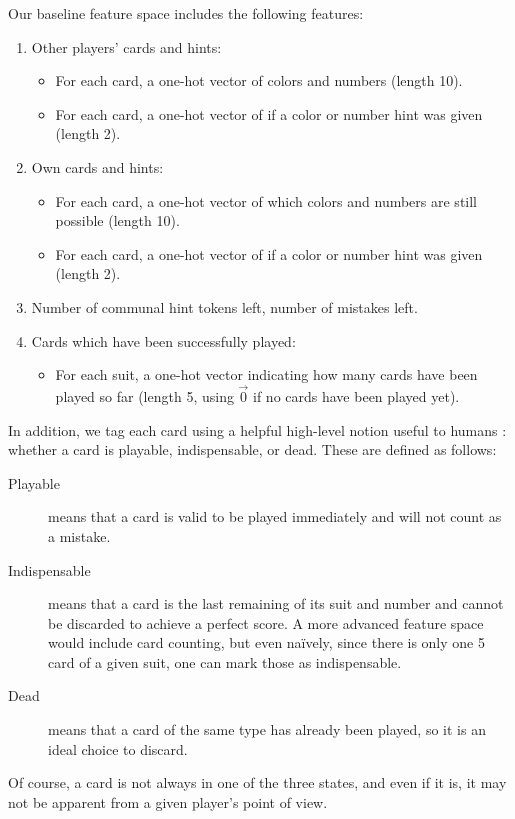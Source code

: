 \documentclass{article}
\begin{document}
Our baseline feature space includes the following features:
\begin{enumerate}
\item Other players' cards and hints:
  \begin{itemize}
  \item For each card, a one-hot vector of colors and numbers (length 10).
  \item For each card, a one-hot vector of if a color or number hint was given (length 2).
  \end{itemize}
\item Own cards and hints:
  \begin{itemize}
  \item For each card, a one-hot vector of which colors and numbers are still possible (length 10).
  \item For each card, a one-hot vector of if a color or number hint was given (length 2).
  \end{itemize}
\item Number of communal hint tokens left, number of mistakes left.
\item Cards which have been successfully played:
  \begin{itemize}
  \item For each suit, a one-hot vector indicating how many cards have been played so far (length 5, using $\vec{0}$ if no cards have been played yet).
  \end{itemize}
\end{enumerate}
In addition, we tag each card using a helpful high-level notion useful to humans \cite{cox15}: whether a card is playable, indispensable, or dead. These are defined as follows:
\begin{description}
\item[Playable] means that a card is valid to be played immediately and will not count as a mistake.
\item[Indispensable] means that a card is the last remaining of its suit and number and cannot be discarded to achieve a perfect score. A more advanced feature space would include card counting, but even na\"ively, since there is only one 5 card of a given suit, one can mark those as indispensable.
\item[Dead] means that a card of the same type has already been played, so it is an ideal choice to discard.
\end{description}
Of course, a card is not always in one of the three states, and even if it is, it may not be apparent from a given player's point of view.
\end{document}

